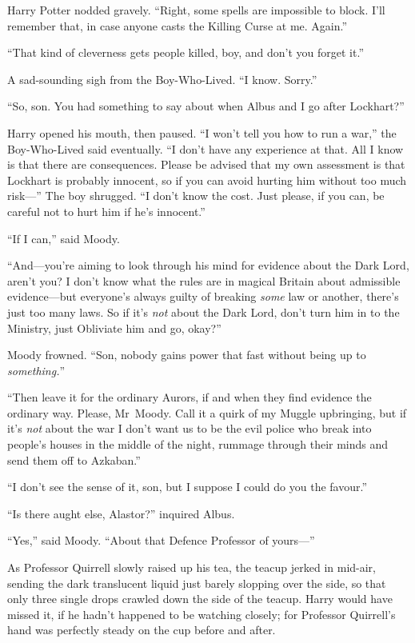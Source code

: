 Harry Potter nodded gravely. “Right, some spells are impossible to block. I’ll remember that, in case anyone casts the Killing Curse at me. Again.”

“That kind of cleverness gets people killed, boy, and don’t you forget it.”

A sad-sounding sigh from the Boy-Who-Lived. “I know. Sorry.”

“So, son. You had something to say about when Albus and I go after Lockhart?”

Harry opened his mouth, then paused. “I won’t tell you how to run a war,” the Boy-Who-Lived said eventually. “I don’t have any experience at that. All I know is that there are consequences. Please be advised that my own assessment is that Lockhart is probably innocent, so if you can avoid hurting him without too much risk—” The boy shrugged. “I don’t know the cost. Just please, if you can, be careful not to hurt him if he’s innocent.”

“If I can,” said Moody.

“And—you’re aiming to look through his mind for evidence about the Dark Lord, aren’t you? I don’t know what the rules are in magical Britain about admissible evidence—but everyone’s always guilty of breaking \emph{some} law or another, there’s just too many laws. So if it’s \emph{not} about the Dark Lord, don’t turn him in to the Ministry, just Obliviate him and go, okay?”

Moody frowned. “Son, nobody gains power that fast without being up to \emph{something.}”

“Then leave it for the ordinary Aurors, if and when they find evidence the ordinary way. Please, Mr~Moody. Call it a quirk of my Muggle upbringing, but if it’s \emph{not} about the war I don’t want us to be the evil police who break into people’s houses in the middle of the night, rummage through their minds and send them off to Azkaban.”

“I don’t see the sense of it, son, but I suppose I could do you the favour.”

“Is there aught else, Alastor?” inquired Albus.

“Yes,” said Moody. “About that Defence Professor of yours—”



As Professor Quirrell slowly raised up his tea, the teacup jerked in mid-air, sending the dark translucent liquid just barely slopping over the side, so that only three single drops crawled down the side of the teacup. Harry would have missed it, if he hadn’t happened to be watching closely; for Professor Quirrell’s hand was perfectly steady on the cup before and after.

